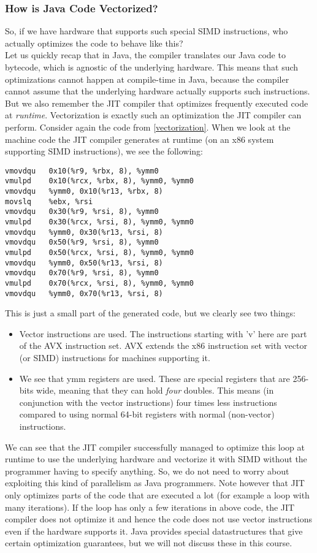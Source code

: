\documentclass[main.tex]{subfiles}
\begin{document}
\subsubsection{How is Java Code Vectorized?}
So, if we have hardware that supports such special SIMD instructions, who actually optimizes the code to behave like this?\\
Let us quickly recap that in Java, the compiler translates our Java code to bytecode, which is agnostic of the underlying hardware. This means that such optimizations cannot happen at compile-time in Java, because the compiler cannot assume that the underlying hardware actually supports such instructions. But we also remember the JIT compiler that optimizes frequently executed code at \textit{runtime}. Vectorization is exactly such an optimization the JIT compiler can perform. Consider again the code from \ref{vectorization}. When we look at the machine code the JIT compiler generates at runtime (on an x86 system supporting SIMD instructions), we see the following:
\begin{verbatim}
vmovdqu   0x10(%r9, %rbx, 8), %ymm0
vmulpd    0x10(%rcx, %rbx, 8), %ymm0, %ymm0
vmovdqu   %ymm0, 0x10(%r13, %rbx, 8)
movslq    %ebx, %rsi
vmovdqu   0x30(%r9, %rsi, 8), %ymm0
vmulpd    0x30(%rcx, %rsi, 8), %ymm0, %ymm0
vmovdqu   %ymm0, 0x30(%r13, %rsi, 8)
vmovdqu   0x50(%r9, %rsi, 8), %ymm0
vmulpd    0x50(%rcx, %rsi, 8), %ymm0, %ymm0
vmovdqu   %ymm0, 0x50(%r13, %rsi, 8)
vmovdqu   0x70(%r9, %rsi, 8), %ymm0
vmulpd    0x70(%rcx, %rsi, 8), %ymm0, %ymm0
vmovdqu   %ymm0, 0x70(%r13, %rsi, 8)
\end{verbatim}
This is just a small part of the generated code, but we clearly see two things:
\begin{itemize}
  \item Vector instructions are used. The instructions starting with 'v' here are part of the AVX instruction set. AVX extends the x86 instruction set with vector (or SIMD) instructions for machines supporting it.
  \item We see that ymm registers are used. These are special registers that are 256-bits wide, meaning that they can hold \textit{four} doubles. This means (in conjunction with the vector instructions) four times less instructions compared to using normal 64-bit registers with normal (non-vector) instructions.
\end{itemize}
We can see that the JIT compiler successfully managed to optimize this loop at runtime to use the underlying hardware and vectorize it with SIMD without the programmer having to specify anything. So, we do not need to worry about exploiting this kind of parallelism as Java programmers. Note however that JIT only optimizes parts of the code that are executed a lot (for example a loop with many iterations). If the loop has only a few iterations in above code, the JIT compiler does not optimize it and hence the code does not use vector instructions even if the hardware supports it. Java provides special datastructures that give certain optimization guarantees, but we will not discuss these in this course.
\end{document}
